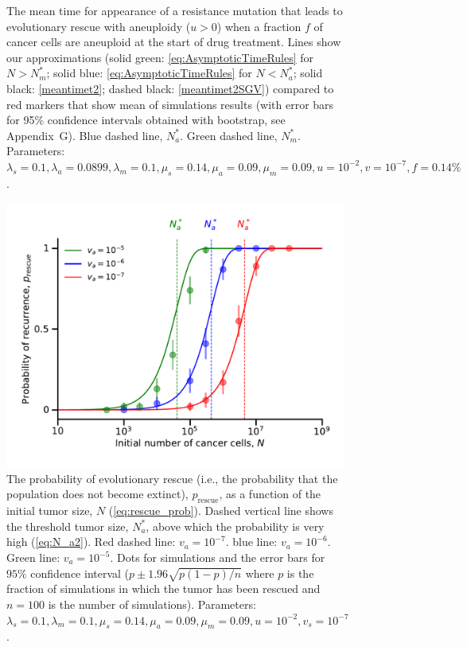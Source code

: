 \documentclass[12pt]{extarticle}
\newcommand{\presc}{p_\text{rescue}}
\begin{document}
\begin{appendices}
\begin{figure}
\caption{The mean time for appearance of a resistance mutation that leads to evolutionary rescue with aneuploidy ($u>0$) when a fraction $f$ of cancer cells are aneuploid at the start of drug treatment. 
Lines show our approximations (solid green: \cref{eq:AsymptoticTimeRules} for $N>N_m^*$; solid blue:  \cref{eq:AsymptoticTimeRules} for $N<N_a^*$; solid black: \cref{meantimet2}; dashed black: \cref{meantimet2SGV}) compared to red markers that show mean of simulations results (with error bars for 95\% confidence intervals obtained with bootstrap, see Appendix G).
Blue dashed line, $N_a^*$.
Green dashed line, $N_m^*$.
Parameters: $\lambda_s=0.1,\lambda_a=0.0899,\lambda_m=0.1,\mu_s=0.14,\mu_a=0.09,\mu_m=0.09, u=10^{-2}, v=10^{-7},f=0.14\%$.} %
\label{SGVEvolutionaryRescueTimeComplete}
\end{figure}
\begin{figure}
\includegraphics[width=1\textwidth]{Figures/ProbvNPlot_ane.pdf}
\caption{The probability of evolutionary rescue (i.e., the probability that the population does not become extinct), $\presc$, as a function of the initial tumor size, $N$ (\cref{eq:rescue_prob}). Dashed vertical line shows the threshold tumor size, $N_a^*$, above which the probability is very high (\cref{eq:N_a2}). Red dashed line: $v_a=10^{-7}$. blue line: $v_a=10^{-6}$. Green line: $v_a=10^{-5}$. Dots for simulations and the error bars for $95\%$ confidence interval ($p\pm1.96\sqrt{p\left(1-p\right)/n}$ where $p$ is the fraction of simulations in which the tumor has been rescued and $n=100$ is the number of simulations). Parameters: $\lambda_s=0.1,\lambda_m=0.1,\mu_s=0.14,\mu_a=0.09,\mu_m=0.09, u=10^{-2}, v_s=10^{-7}$.}
\label{rescue_prob_ane}
\end{figure}
\end{appendices}
\end{document}
